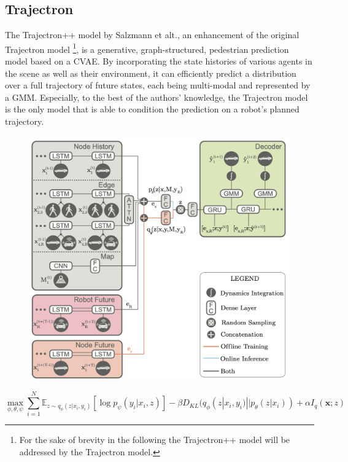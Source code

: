 \subsection{Trajectron}
The Trajectron++ model \cite{Salzmann2020} by Salzmann et alt., an enhancement of the original Trajectron model \cite{Ivanovic2018}\footnote{For the sake of brevity in the following the Trajectron++ model will be addressed by the Trajectron model.}, is a generative, graph-structured, pedestrian prediction model based on a C\ac{VAE}. By incorporating the state histories of various agents in the scene as well as their environment, it can efficiently predict a distribution over a full trajectory of future states, each being multi-modal and represented by a \ac{GMM}. Especially, to the best of the authors' knowledge, the Trajectron model is the only model that is able to condition the prediction on a robot's planned trajectory.

\begin{figure}[!ht]
\begin{center}
\includegraphics[width=\imgwidth]{images/trajectron++.png}
\label{img:trajectron_model}
\end{center}
\end{figure}

\begin{equation}
\max_{\phi, \theta, \psi} \sum_{i=1}^N \mathbb{E}_{z \sim q_{\phi}(z | x_i, y_i)} [\log p_\psi (y_i | x_i, z)] - \beta D_{KL} (q_{\phi}(z | x_i, y_i) || p_{\theta}(z | x_i)) + \alpha I_q(\boldsymbol{x}; z)
\label{eq:trajectron_loss}
\end{equation}

